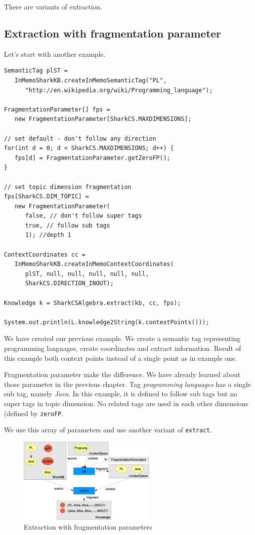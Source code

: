 There are variants of extraction.

\subsection{Extraction with fragmentation parameter}
Let's start with another example.

\begin{verbatim}
SemanticTag plST =
   InMemoSharkKB.createInMemoSemanticTag("PL",
      "http://en.wikipedia.org/wiki/Programming_language");

FragmentationParameter[] fps =
   new FragmentationParameter[SharkCS.MAXDIMENSIONS];

// set default - don't follow any direction
for(int d = 0; d < SharkCS.MAXDIMENSIONS; d++) {
   fps[d] = FragmentationParameter.getZeroFP();
}

// set topic dimension fragmentation
fps[SharkCS.DIM_TOPIC] =
   new FragmentationParameter(
      false, // don't follow super tags
      true, // follow sub tags
      1); //depth 1

ContextCoordinates cc =
   InMemoSharkKB.createInMemoContextCoordinates(
      plST, null, null, null, null, null,
      SharkCS.DIRECTION_INOUT);

Knowledge k = SharkCSAlgebra.extract(kb, cc, fps);

System.out.println(L.knowledge2String(k.contextPoints()));
\end{verbatim}

We have created our previous example. We create a semantic tag representing programming languages, create coordinates and extract information.
Result of this example both context points instead of a single point as in example one.

Fragmentation parameter make the difference. We have already learned about those parameter in the previous chapter. Tag {\it programming languages} has a single sub tag, namely {\it Java}. In this example, it is defined to follow sub tags but no super tags in topic dimension. No related tags are used in each other dimensions (defined by {\tt zeroFP}.

We use this array of parameters and use another variant of {\tt extract}.
\begin{figure}[t]
\centering
\includegraphics[width=0.60\textwidth]{extractionWithFPs.eps}
\caption{Extraction with fragmentation parameters}
\label{fig:extractionWithFPs}
\end{figure}

